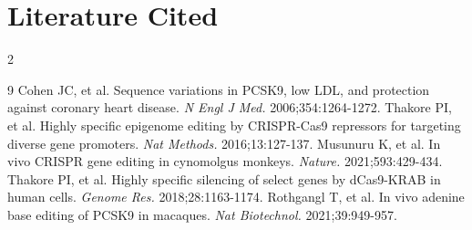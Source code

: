 \documentclass[11pt]{article}
\begin{document}
\section{Literature Cited}
\vspace{-3mm}
\begin{multicols}{2}
\begin{scriptsize}
\begin{thebibliography}{9}
 Cohen JC, et al. Sequence variations in PCSK9, low LDL, and protection against coronary heart disease. \textit{N Engl J Med.} 2006;354:1264-1272.
 Thakore PI, et al. Highly specific epigenome editing by CRISPR-Cas9 repressors for targeting diverse gene promoters. \textit{Nat Methods.} 2016;13:127-137.
 Musunuru K, et al. In vivo CRISPR gene editing in cynomolgus monkeys. \textit{Nature.} 2021;593:429-434.
 Thakore PI, et al. Highly specific silencing of select genes by dCas9-KRAB in human cells. \textit{Genome Res.} 2018;28:1163-1174.
 Rothgangl T, et al. In vivo adenine base editing of PCSK9 in macaques. \textit{Nat Biotechnol.} 2021;39:949-957.
\end{thebibliography}
\end{scriptsize}
\end{multicols}
\end{document}
